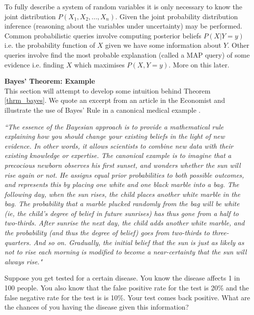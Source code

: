 To fully describe a system of random variables it is only necessary to know the joint distribution $P(X_1,X_2,...,X_n)$. Given the joint probability distribution inference (reasoning about the variables under uncertainty) may be performed. Common probabilistic queries involve computing posterior beliefs $P(X|Y=y)$ i.e. the probability function of $X$ given we have some information about $Y$. Other queries involve find the most probable explanation (called a MAP query) of some evidence i.e. finding $X$ which maximises $P(X, Y=y)$. More on this later. 

\textbf{Bayes' Theorem: Example}\\
This section will attempt to develop some intuition behind Theorem \ref{thrm_bayes}. We quote an excerpt from an article in the Economist \cite{eco1} and illustrate the use of Bayes' Rule in a canonical medical example \cite{korb}.

\textit{``The essence of the Bayesian approach is to provide a mathematical rule explaining how you should change your existing beliefs in the light of new evidence. In other words, it allows scientists to combine new data with their existing knowledge or expertise. The canonical example is to imagine that a precocious newborn observes his first sunset, and wonders whether the sun will rise again or not. He assigns equal prior probabilities to both possible outcomes, and represents this by placing one white and one black marble into a bag. The following day, when the sun rises, the child places another white marble in the bag. The probability that a marble plucked randomly from the bag will be white (ie, the child's degree of belief in future sunrises) has thus gone from a half to two-thirds. After sunrise the next day, the child adds another white marble, and the probability (and thus the degree of belief) goes from two-thirds to three-quarters. And so on. Gradually, the initial belief that the sun is just as likely as not to rise each morning is modified to become a near-certainty that the sun will always rise."}

Suppose you get tested for a certain disease. You know the disease affects 1 in 100 people. You also know that the false positive rate for the test is 20\% and the false negative rate for the test is is 10\%. Your test comes back positive. What are the chances of you having the disease given this information?

